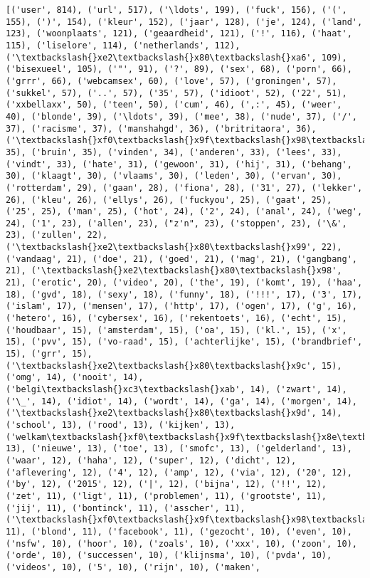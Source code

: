 \documentclass{article}
\begin{document}
    \begin{Verbatim}[commandchars=\\\{\}]
[('user', 814), ('url', 517), ('\ldots', 199), ('fuck', 156), ('(', 155), (')', 154), ('kleur', 152), ('jaar', 128), ('je', 124), ('land', 123), ('woonplaats', 121), ('geaardheid', 121), ('!', 116), ('haat', 115), ('liselore', 114), ('netherlands', 112), ('\textbackslash{}xe2\textbackslash{}x80\textbackslash{}xa6', 109), ('bisexueel', 105), ('"', 91), ('?', 89), ('sex', 68), ('porn', 66), ('grrr', 66), ('webcamsex', 60), ('love', 57), ('groningen', 57), ('sukkel', 57), ('..', 57), ('35', 57), ('idioot', 52), ('22', 51), ('xxbellaxx', 50), ('teen', 50), ('cum', 46), (',:', 45), ('weer', 40), ('blonde', 39), ('\ldots', 39), ('mee', 38), ('nude', 37), ('/', 37), ('racisme', 37), ('manshahgd', 36), ('britritaora', 36), ('\textbackslash{}xf0\textbackslash{}x9f\textbackslash{}x98\textbackslash{}x82', 35), ('bruin', 35), ('vinden', 34), ('anderen', 33), ('lees', 33), ('vindt', 33), ('hate', 31), ('gewoon', 31), ('hij', 31), ('behang', 30), ('klaagt', 30), ('vlaams', 30), ('leden', 30), ('ervan', 30), ('rotterdam', 29), ('gaan', 28), ('fiona', 28), ('31', 27), ('lekker', 26), ('kleu', 26), ('ellys', 26), ('fuckyou', 25), ('gaat', 25), ('25', 25), ('man', 25), ('hot', 24), ('2', 24), ('anal', 24), ('weg', 24), ('1', 23), ('allen', 23), ("z'n", 23), ('stoppen', 23), ('\&', 23), ('zullen', 22), ('\textbackslash{}xe2\textbackslash{}x80\textbackslash{}x99', 22), ('vandaag', 21), ('doe', 21), ('goed', 21), ('mag', 21), ('gangbang', 21), ('\textbackslash{}xe2\textbackslash{}x80\textbackslash{}x98', 21), ('erotic', 20), ('video', 20), ('the', 19), ('komt', 19), ('haa', 18), ('gvd', 18), ('sexy', 18), ('funny', 18), ('!!!', 17), ('3', 17), ('islam', 17), ('mensen', 17), ('http', 17), ('ogen', 17), ('g', 16), ('hetero', 16), ('cybersex', 16), ('rekentoets', 16), ('echt', 15), ('houdbaar', 15), ('amsterdam', 15), ('oa', 15), ('kl.', 15), ('x', 15), ('pvv', 15), ('vo-raad', 15), ('achterlijke', 15), ('brandbrief', 15), ('grr', 15), ('\textbackslash{}xe2\textbackslash{}x80\textbackslash{}x9c', 15), ('omg', 14), ('nooit', 14), ('belgi\textbackslash{}xc3\textbackslash{}xab', 14), ('zwart', 14), ('\_', 14), ('idiot', 14), ('wordt', 14), ('ga', 14), ('morgen', 14), ('\textbackslash{}xe2\textbackslash{}x80\textbackslash{}x9d', 14), ('school', 13), ('rood', 13), ('kijken', 13), ('welkam\textbackslash{}xf0\textbackslash{}x9f\textbackslash{}x8e\textbackslash{}x89\textbackslash{}xf0\textbackslash{}x9f\textbackslash{}x8e\textbackslash{}x89', 13), ('nieuwe', 13), ('toe', 13), ('smofc', 13), ('gelderland', 13), ('waar', 12), ('haha', 12), ('super', 12), ('dicht', 12), ('aflevering', 12), ('4', 12), ('amp', 12), ('via', 12), ('20', 12), ('by', 12), ('2015', 12), ('|', 12), ('bijna', 12), ('!!', 12), ('zet', 11), ('ligt', 11), ('problemen', 11), ('grootste', 11), ('jij', 11), ('bontinck', 11), ('asscher', 11), ('\textbackslash{}xf0\textbackslash{}x9f\textbackslash{}x98\textbackslash{}x8d', 11), ('blond', 11), ('facebook', 11), ('gezocht', 10), ('even', 10), ('nsfw', 10), ('hoor', 10), ('zoals', 10), ('xxx', 10), ('zoon', 10), ('orde', 10), ('successen', 10), ('klijnsma', 10), ('pvda', 10), ('videos', 10), ('5', 10), ('rijn', 10), ('maken', 
\end{Verbatim}
\end{document}
